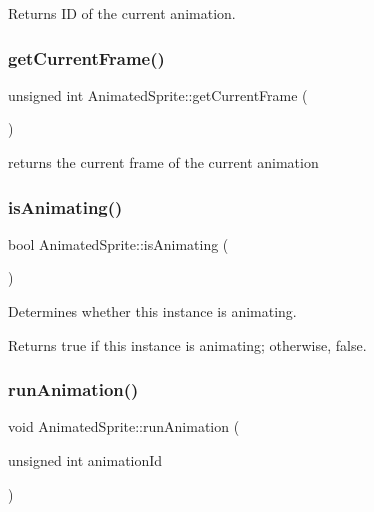 \begin{DoxyReturn}{Returns}
ID of the current animation.
\end{DoxyReturn}
\mbox{\label{class_animated_sprite_a4d7dc2868007f5b15d3b25f7ab918155}} 
\subsubsection{\texorpdfstring{get\+Current\+Frame()}{getCurrentFrame()}}
{\footnotesize\ttfamily unsigned int Animated\+Sprite\+::get\+Current\+Frame (\begin{DoxyParamCaption}{ }\end{DoxyParamCaption})}



returns the current frame of the current animation

\mbox{\label{class_animated_sprite_a40beb8105603bf726270fb38400fe6bf}} 
\subsubsection{\texorpdfstring{is\+Animating()}{isAnimating()}}
{\footnotesize\ttfamily bool Animated\+Sprite\+::is\+Animating (\begin{DoxyParamCaption}{ }\end{DoxyParamCaption})}



Determines whether this instance is animating. 

\begin{DoxyReturn}{Returns}
{\ttfamily true} if this instance is animating; otherwise, {\ttfamily false}. 
\end{DoxyReturn}
\mbox{\label{class_animated_sprite_a38725e0f5facf5d3d993500476790a9f}} 
\subsubsection{\texorpdfstring{run\+Animation()}{runAnimation()}}
{\footnotesize\ttfamily void Animated\+Sprite\+::run\+Animation (\begin{DoxyParamCaption}\item[{unsigned int}]{animation\+Id }\end{DoxyParamCaption})}



